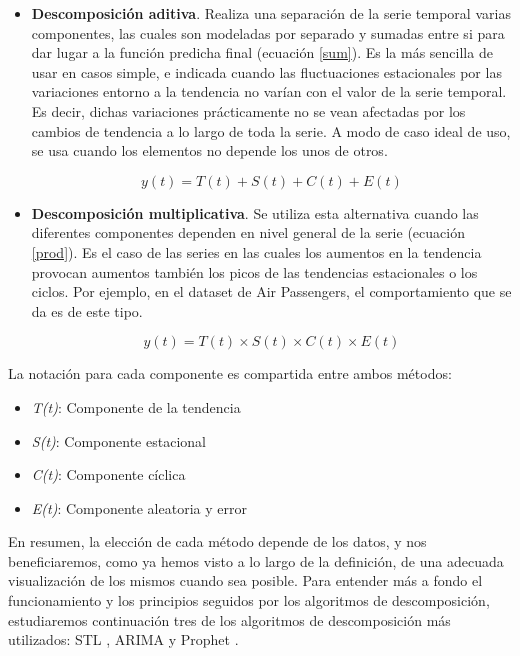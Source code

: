 \begin{itemize}
    \item \textbf{Descomposición aditiva}. Realiza una separación de la serie temporal varias componentes, las cuales son modeladas por separado y sumadas entre si para dar lugar a la función predicha final (ecuación \ref{sum}). Es la más sencilla de usar en casos simple, e indicada cuando las fluctuaciones estacionales por las variaciones entorno a la tendencia no varían con el valor de la serie temporal. Es decir, dichas variaciones prácticamente no se vean afectadas por los cambios de tendencia a lo largo de toda la serie. A modo de caso ideal de uso, se usa cuando los elementos no depende los unos de otros.

    \begin{equation}
        y(t) = T(t) + S(t) + C(t) + E(t)
        \label{sum}
    \end{equation}

    \item \textbf{Descomposición multiplicativa}. Se utiliza esta alternativa cuando las diferentes componentes dependen en nivel general de la serie (ecuación \ref{prod}). Es el caso de las series en las cuales los aumentos en la tendencia provocan aumentos también los picos de las tendencias estacionales o los ciclos. Por ejemplo, en el dataset de Air Passengers, el comportamiento que se da es de este tipo.

    \begin{equation}
        y(t) = T(t) \times S(t) \times C(t) \times E(t)
        \label{prod}
    \end{equation}

\end{itemize}

La notación para cada componente es compartida entre ambos métodos:

\begin{itemize}
    \item \textit{T(t)}: Componente de la tendencia

    \item \textit{S(t)}: Componente estacional

    \item \textit{C(t)}: Componente cíclica

    \item \textit{E(t)}: Componente aleatoria y error
\end{itemize}

En resumen, la elección de cada método depende de los datos, y nos beneficiaremos, como ya hemos visto a lo largo de la definición, de una adecuada visualización de los mismos cuando sea posible. Para entender más a fondo el funcionamiento y los principios seguidos por los algoritmos de descomposición, estudiaremos continuación tres de los algoritmos de descomposición más utilizados: STL \cite{cleveland1990stl}, ARIMA \cite{box1970time} y Prophet \cite{taylor2018prophet}.

